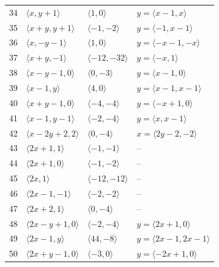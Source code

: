 \documentclass[11pt]{article}
\begin{document}
\begin{longtable}{@{}rlll@{}}
34 & $\langle x,y+1\rangle$ & $\langle 1,0\rangle$ & $y=\langle x-1,x\rangle$\\
35 & $\langle x+y,y+1\rangle$ & $\langle -1,-2\rangle$ & $y=\langle -1,x-1\rangle$\\
36 & $\langle x,-y-1\rangle$ & $\langle 1,0\rangle$ & $y=\langle -x-1,-x\rangle$\\
37 & $\langle x+y,-1\rangle$ & $\langle -12,-32\rangle$ & $y=\langle -x,1\rangle$\\
38 & $\langle x-y-1,0\rangle$ & $\langle 0,-3\rangle$ & $y=\langle x-1,0\rangle$\\
39 & $\langle x-1,y\rangle$ & $\langle 4,0\rangle$ & $y=\langle x-1,x-1\rangle$\\
40 & $\langle x+y-1,0\rangle$ & $\langle -4,-4\rangle$ & $y=\langle -x+1,0\rangle$\\
41 & $\langle x-1,y-1\rangle$ & $\langle -2,-4\rangle$ & $y=\langle x,x-1\rangle$\\
42 & $\langle x-2y+2,2\rangle$ & $\langle 0,-4\rangle$ & $x=\langle 2y-2,-2\rangle$\\
43 & $\langle 2x+1,1\rangle$ & $\langle -1,-1\rangle$ & --\\
44 & $\langle 2x+1,0\rangle$ & $\langle -1,-2\rangle$ & --\\
45 & $\langle 2x,1\rangle$ & $\langle -12,-12\rangle$ & --\\
46 & $\langle 2x-1,-1\rangle$ & $\langle -2,-2\rangle$ & --\\
47 & $\langle 2x+2,1\rangle$ & $\langle 0,-4\rangle$ & --\\
48 & $\langle 2x-y+1,0\rangle$ & $\langle -2,-4\rangle$ & $y=\langle 2x+1,0\rangle$\\
49 & $\langle 2x-1,y\rangle$ & $\langle 44,-8\rangle$ & $y=\langle 2x-1,2x-1\rangle$\\
50 & $\langle 2x+y-1,0\rangle$ & $\langle -3,0\rangle$ & $y=\langle -2x+1,0\rangle$\\
\end{longtable}
\endgroup
\end{document}
